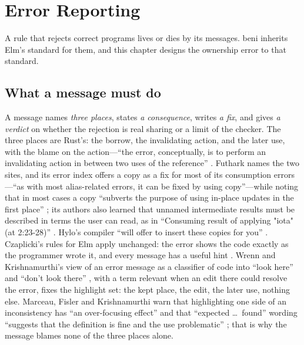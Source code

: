 \chapter{Error Reporting}
\label{sec:errors}

A rule that rejects correct programs lives or dies by its messages. beni inherits Elm's standard for
them, and this chapter designs the ownership error to that standard.

\section{What a message must do}
\label{sec:errors-principles}

A message names \emph{three places}, states \emph{a consequence}, writes \emph{a fix}, and gives
\emph{a verdict} on whether the rejection is real sharing or a limit of the checker. The three places
are Rust's: the borrow, the invalidating action, and the later use, with the blame on the action---``the
error, conceptually, is to perform an invalidating action in between two uses of the reference''
\citep{rfc2094}. Futhark names the two sites, and its error index offers a copy as a fix for most of
its consumption errors---``as with most alias-related errors, it can be fixed by using copy''---while
noting that in most cases a copy ``subverts the purpose of using in-place updates in the first place''
\citep[\S8.1]{futhark2026errorindex}; its authors also learned that unnamed intermediate results must be
described in terms the user can read, as in ``Consuming result of applying "iota" (at 2:23-28)''
\citep{henriksen2021anatomy}. Hylo's compiler ``will offer to insert these copies for you''
\citep{hylo2024bindings}. Czaplicki's rules for Elm apply unchanged: the error shows the code exactly as
the programmer wrote it, and every message has a useful hint \citep{czaplicki2015errors}. Wrenn and
Krishnamurthi's view of an error message as a classifier of code into ``look here'' and ``don't look
there'' \citep[\S2]{wrenn2017classifiers}, with a term relevant when an edit there could resolve the
error, fixes the highlight set: the kept place, the edit, the later use, nothing else. Marceau, Fisler
and Krishnamurthi warn that highlighting one side of an inconsistency has ``an over-focusing effect''
and that ``expected \ldots\ found'' wording ``suggests that the definition is fine and the use
problematic'' \citep[\S7.2]{marceau2011mind}; that is why the message blames none of the three places
alone.

